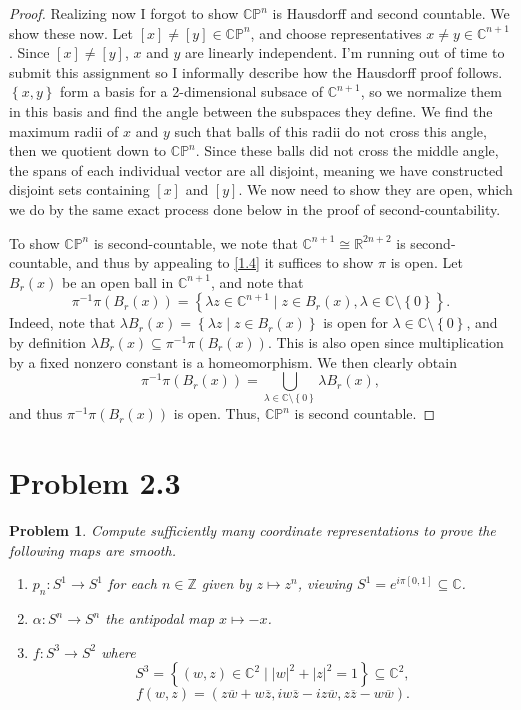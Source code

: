 \documentclass[11pt, letterpaper]{article}
\theoremstyle{theorem}
\newtheorem{problem}{Problem}
\begin{document}
\begin{proof}
	Realizing now I forgot to show $\mathbb{C}\mathbb{P} ^n$ is Hausdorff and second countable. We show these now. Let $[x]\neq [y]\in\mathbb{C} \mathbb{P} ^n$, and choose representatives $x\neq y\in\mathbb{C} ^{n+1} $. Since $[x]\neq [y]$, $x$ and $y$ are linearly independent. I'm running out of time to submit this assignment so I informally describe how the Hausdorff proof follows. $\left\{ x,y \right\} $ form a basis for a 2-dimensional subsace of $\mathbb{C} ^{n+1} $, so we normalize them in this basis and find the angle between the subspaces they define. We find the maximum radii of $x$ and $y$ such that balls of this radii do not cross this angle, then we quotient down to $\mathbb{C} \mathbb{P} ^n$. Since these balls did not cross the middle angle, the spans of each individual vector are all disjoint, meaning we have constructed disjoint sets containing $[x]$ and $[y]$. We now need to show they are open, which we do by the same exact process done below in the proof of second-countability.

	To show $\mathbb{C} \mathbb{P} ^{n} $ is second-countable, we note that $\mathbb{C} ^{n+1} \cong \mathbb{R} ^{2n+2} $ is second-countable, and thus by appealing to \cref{1.4} it suffices to show $\pi $ is open. Let $B_r(x)$ be an open ball in $\mathbb{C} ^{n+1} $, and note that
	\[
		\pi ^{-1} \pi (B_r(x))=\left\{ \lambda z\in\mathbb{C} ^{n+1} \mid z\in B_r(x),\lambda \in\mathbb{C} \setminus \left\{ 0 \right\}  \right\} 
	.\]
	Indeed, note that $\lambda B_r(x)=\left\{ \lambda z\mid z\in B_r(x) \right\} $ is open for $\lambda \in\mathbb{C} \setminus \left\{ 0 \right\} $, and by definition $\lambda B_r(x)\subseteq \pi ^{-1} \pi (B_r(x))$. This is also open since multiplication by a fixed nonzero constant is a homeomorphism. We then clearly obtain
	\[
		\pi ^{-1} \pi (B_r(x))=\bigcup_{\lambda \in\mathbb{C} \setminus \left\{ 0 \right\} } \lambda B_r(x),
	\]
	and thus $\pi ^{-1} \pi (B_r(x))$ is open. Thus, $\mathbb{C} \mathbb{P} ^n$ is second countable.
\end{proof}

\section{Problem 2.3}
\begin{problem}\label{5}
	Compute sufficiently many coordinate representations to prove the following maps are smooth.
	\begin{enumerate}
		\item $p_n : S^1 \to S^1$ for each $n\in\mathbb{Z} $ given by $z\mapsto z^n$, viewing $S^1 = e^{i \pi [0,1]}  \subseteq \mathbb{C} $.
		\item $\alpha : S^n \to S^n$ the antipodal map $x\mapsto -x$.
		\item $f : S^3 \to S^2$ where
			\[
				S^3 = \left\{ (w,z)\in\mathbb{C} ^2\mid \left| w \right| ^2+\left| z \right| ^2=1 \right\} \subseteq \mathbb{C} ^2,
			\]
			\[
				f(w,z) = (z \overline{w} +w \overline{z} ,iw \overline{z} -iz \overline{w} , z \overline{z} -w \overline{w} )
			.\]
	\end{enumerate}
\end{problem}
\end{document}
